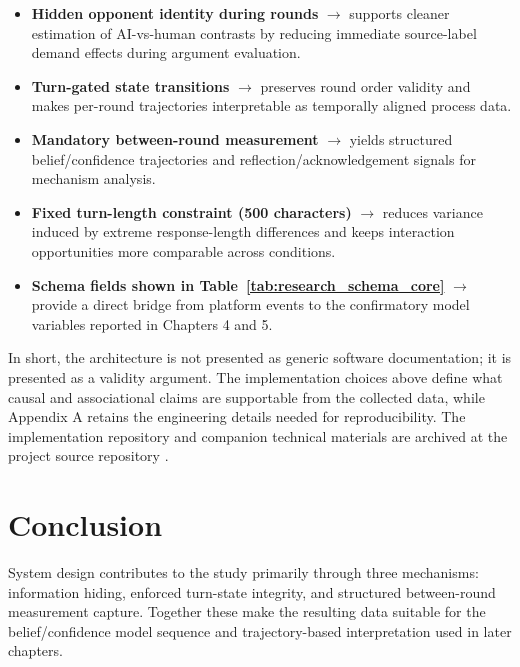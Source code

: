 \begin{itemize}
    \item \textbf{Hidden opponent identity during rounds} $\rightarrow$ supports cleaner estimation of
	    AI-vs-human contrasts by reducing immediate source-label demand effects during argument evaluation.
    \item \textbf{Turn-gated state transitions} $\rightarrow$ preserves round order validity and makes
	    per-round trajectories interpretable as temporally aligned process data.
    \item \textbf{Mandatory between-round measurement} $\rightarrow$ yields structured belief/confidence
	    trajectories and reflection/acknowledgement signals for mechanism analysis.
    \item \textbf{Fixed turn-length constraint (500 characters)} $\rightarrow$ reduces variance induced by
	    extreme response-length differences and keeps interaction opportunities more comparable across conditions.
    \item \textbf{Schema fields shown in Table~\ref{tab:research_schema_core}} $\rightarrow$ provide a
	    direct bridge from platform events to the confirmatory model variables reported in Chapters 4 and 5.
\end{itemize}

In short, the architecture is not presented as generic software documentation;
it is presented as a validity argument. The implementation choices above define
what causal and associational claims are supportable from the collected data,
while Appendix A retains the engineering details needed for reproducibility.
The implementation repository and companion technical materials are archived at
the project source repository \cite{debateplatform_repo}.

\section{Conclusion}

System design contributes to the study primarily through three mechanisms:
information hiding, enforced turn-state integrity, and structured between-round
measurement capture. Together these make the resulting data suitable for the
belief/confidence model sequence and trajectory-based interpretation used in
later chapters.
